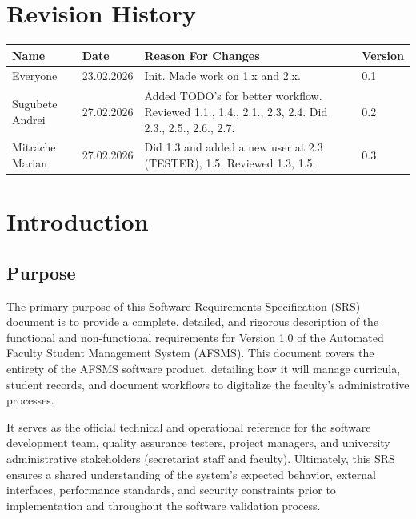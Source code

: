 \documentclass[11pt, a4paper]{article}
\begin{document}
\tableofcontents
\newpage

\section*{Revision History}

\begin{table}[htbp]
\centering
\begin{tabularx}{\textwidth}{l l X l}
\toprule
\textbf{Name} & \textbf{Date} & \textbf{Reason For Changes} & \textbf{Version} \\
\midrule
Everyone & 23.02.2026 & Init. Made work on 1.x and 2.x. & 0.1 \\
\midrule
Sugubete Andrei & 27.02.2026 & Added TODO's for better workflow. Reviewed 1.1., 1.4., 2.1., 2.3, 2.4. Did 2.3., 2.5., 2.6., 2.7. & 0.2 \\
\midrule
Mitrache Marian & 27.02.2026 & Did 1.3 and added a new user at 2.3 (TESTER), 1.5. Reviewed 1.3, 1.5. & 0.3 \\
\bottomrule
\end{tabularx}
\end{table}

\newpage

\section{Introduction}

\subsection{Purpose}
The primary purpose of this Software Requirements Specification (SRS) document is to provide a complete, detailed, and rigorous description of the functional and non-functional requirements for Version 1.0 of the Automated Faculty Student Management System (AFSMS). This document covers the entirety of the AFSMS software product, detailing how it will manage curricula, student records, and document workflows to digitalize the faculty's administrative processes.

It serves as the official technical and operational reference for the software development team, quality assurance testers, project managers, and university administrative stakeholders (secretariat staff and faculty). Ultimately, this SRS ensures a shared understanding of the system's expected behavior, external interfaces, performance standards, and security constraints prior to implementation and throughout the software validation process.
\end{document}
